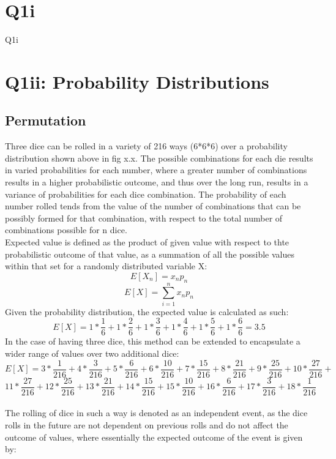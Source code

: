 \documentclass[12pt]{article}
\begin{document}
\tableofcontents
\listoffigures
{}
\listoftables
{}
\thispagestyle{empty}
\cleardoublepage
\setcounter{page}{1}

\section{Q1i}
Q1i
\clearpage

\section{Q1ii: Probability Distributions}
\subsection{Permutation}
Three dice can be rolled in a variety of 216 ways (6*6*6) over a probability distribution shown above in fig x.x. The possible combinations for each die results in varied probabilities for each number, where a greater number of combinations results in a higher probabilistic outcome, and thus over the long run, results in a variance of probabilities for each dice combination. The probability of each number rolled tends from the value of the number of combinations that can be possibly formed for that combination, with respect to the total number of combinations possible for n dice.\\
Expected value is defined as the product of given value with respect to thte probabilistic outcome of that value, as a summation of all the possible values  within that set for a randomly distributed variable X:
$$E[X_n]=x_np_n$$
$$E[X]=\sum_{i=1}^{n}x_np_n$$
Given the probability distribution, the expected value is calculated as such:
$$E[X]=1*\frac{1}{6}+1*\frac{2}{6}+1*\frac{3}{6}+1*\frac{4}{6}+1*\frac{5}{6}+1*\frac{6}{6}=3.5$$
In the case of having three dice, this method can be extended to encapsulate a wider range of values over two additional dice:
$$E[X]=3*\frac{1}{216}+4*\frac{3}{216}+5*\frac{6}{216}+6*\frac{10}{216}+7*\frac{15}{216}+8*\frac{21}{216}+9*\frac{25}{216}+10*\frac{27}{216}+$$
$$11*\frac{27}{216}+12*\frac{25}{216}+13*\frac{21}{216}+14*\frac{15}{216}+15*\frac{10}{216}+16*\frac{6}{216}+17*\frac{3}{216}+18*\frac{1}{216}$$\\
The rolling of dice in such a way is denoted as an independent event, as the dice rolls in the future are not dependent on previous rolls and do not affect the outcome of values, where essentially the expected outcome of the event is given by:
\end{document}
